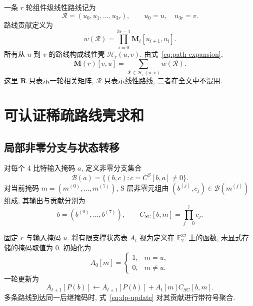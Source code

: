 \documentclass[UTF8,a4paper,zihao=-4,fontset=fandol]{ctexart}
\numberwithin{equation}{section}
\theoremstyle{definition}
\theoremstyle{plain}
\theoremstyle{remark}
\newcommand{\Route}{\mathcal{R}}
\newcommand{\Hull}{\mathcal{H}}
\begin{document}
一条 $r$ 轮组件级线性路线记为
\begin{equation}
\Route=(u_0,u_1,\ldots,u_{3r}),\qquad u_0=u,\quad u_{3r}=v.
\label{eq:route-def}
\end{equation}
路线贡献定义为
\begin{equation}
w(\Route)=\prod_{i=0}^{3r-1}\bm{M}_i[u_{i+1},u_i].
\label{eq:route-weight}
\end{equation}
所有从 $u$ 到 $v$ 的路线构成线性壳 $\Hull_r(u,v)$. 由式~\eqref{eq:path-expansion},
\begin{equation}
\bm{M}(r)[v,u]=\sum_{\Route\in\Hull_r(u,v)}w(\Route).
\label{eq:hull-sum}
\end{equation}
这里 $\bm{R}$ 只表示一轮相关矩阵, $\Route$ 只表示线性路线, 二者在全文中不混用.

\section{可认证稀疏路线壳求和}

\subsection{局部非零分支与状态转移}

对每个 4 比特输入掩码 $a$, 定义非零分支集合
\begin{equation}
\mathcal B(a)=\{(b,c):c=C^S[b,a]\neq 0\}.
\label{eq:branch-set}
\end{equation}
对当前掩码 $m=(m^{(0)},\ldots,m^{(7)})$, S 层非零元组由 $(b^{(j)},c_j)\in\mathcal B(m^{(j)})$ 组成, 其输出与贡献分别为
\begin{equation}
b=(b^{(0)},\ldots,b^{(7)}),\qquad C_{SC}[b,m]=\prod_{j=0}^{7}c_j.
\label{eq:tuple-weight}
\end{equation}

固定 $r$ 与输入掩码 $u$. 将有限支撑状态表 $A_t$ 视为定义在 $\mathbb F_2^{32}$ 上的函数, 未显式存储的掩码取值为 0. 初始化为
\begin{equation}
A_0[m]=\begin{cases}1,&m=u,\\0,&m\neq u.\end{cases}
\label{eq:init-state}
\end{equation}
一轮更新为
\begin{equation}
A_{t+1}[P(b)]\leftarrow A_{t+1}[P(b)]+A_t[m]C_{SC}[b,m].
\label{eq:dp-update}
\end{equation}
多条路线到达同一后继掩码时, 式~\eqref{eq:dp-update} 对其贡献进行带符号聚合.
\end{document}
